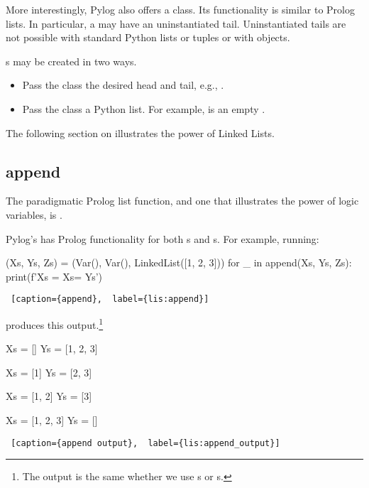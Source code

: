 More interestingly, Pylog also offers a  class. Its functionality is similar to Prolog lists. In particular, a  may have an uninstantiated tail. Uninstantiated tails are not possible with standard Python lists or tuples or with  objects.
\smallv

s may be created in two ways.
\begin{itemize}
    \item Pass the  class the desired head and tail, e.g., \newline{}.
    \item Pass the   class a Python list. For example,
     is an empty . 
\end{itemize}

The following section on  illustrates the power of Linked Lists.
\subsection{append} \label{subsec:append}

The paradigmatic Prolog list function, and one that illustrates the power of logic variables, is . 

Pylog's  has Prolog functionality for both s and s. For example, running:

\begin{minipage}{\linewidth}  \largev \hrulefill
\begin{python}
(Xs, Ys, Zs) = (Var(), Var(), LinkedList([1, 2, 3]))
for _ in append(Xs, Ys, Zs):
  print(f'Xs = {Xs}\nYs = {Ys}\n')
\end{python}
\begin{lstlisting} [caption={append},  label={lis:append}]
\end{lstlisting}
\end{minipage}
produces this output.\footnote{The output is the same whether we use s or s.}
\smallv

\begin{minipage}{\linewidth}  \largev \hrulefill
\begin{python}
Xs = []
Ys = [1, 2, 3]

Xs = [1]
Ys = [2, 3]

Xs = [1, 2]
Ys = [3]

Xs = [1, 2, 3]
Ys = []
\end{python}
\begin{lstlisting} [caption={append output},  label={lis:append_output}]
\end{lstlisting}
\end{minipage}
\smallv

